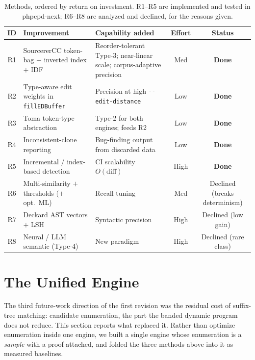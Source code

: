 \documentclass[10pt,a4paper]{article}
\newcounter{lem}[section]
\begin{document}
\begin{table}[h]
\centering
\caption{Methods, ordered by return on investment. R1--R5 are implemented and tested in
phpcpd-next; R6--R8 are analyzed and declined, for the reasons given.}
\label{tab:roadmap}
\footnotesize
\renewcommand{\arraystretch}{1.2}
\begin{tabular}{@{}c p{3.5cm} p{4.2cm} c c@{}}
\toprule
\textbf{ID} & \textbf{Improvement} & \textbf{Capability added} & \textbf{Effort} & \textbf{Status} \\
\midrule
R1 & SourcererCC token-bag $+$ inverted index $+$ IDF & Reorder-tolerant Type-3; near-linear scale;
     corpus-adaptive precision & Med & \textbf{Done} \\
R2 & Type-aware edit weights in \lstinline!fillEDBuffer! & Precision at high
     \texttt{-{}-edit-distance} & Low & \textbf{Done} \\
R3 & Toma token-type abstraction & Type-2 for both engines; feeds R2 & Low & \textbf{Done} \\
R4 & Inconsistent-clone reporting & Bug-finding output from discarded data & Low & \textbf{Done} \\
R5 & Incremental / index-based detection & CI scalability $O(\text{diff})$ & High & \textbf{Done} \\
R6 & Multi-similarity $+$ thresholds ($+$ opt.\ ML) & Recall tuning & Med & Declined (breaks determinism) \\
R7 & Deckard AST vectors $+$ LSH~\cite{deckard} & Syntactic precision & High & Declined (low gain) \\
R8 & Neural / LLM semantic (Type-4) & New paradigm & High & Declined (rare class) \\
\bottomrule
\end{tabular}
\end{table}

\section{The Unified Engine}
\label{sec:unified}

The third future-work direction of the first revision was the residual cost of suffix-tree
matching: candidate enumeration, the part the banded dynamic program does not reduce. This
section reports what replaced it. Rather than optimize enumeration inside one engine, we built a
single engine whose enumeration is a \emph{sample} with a proof attached, and folded the three
methods above into it as measured baselines.
\end{document}
